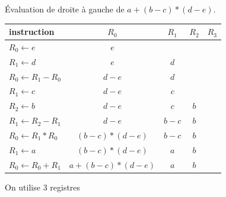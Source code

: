 \begin{Exercise}
 Évaluation de droite à gauche de $a+(b-c)*(d-e)$.
  \begin{center}
    \begin{tabular}{l|c|c|c|c}
       instruction&$R_0$&$R_1$&$R_2$&$R_3$ \\
       \hline
       $R_0 \leftarrow e$& $e$&&&\\
       $R_1 \leftarrow d$& $e$&$d$&&\\
       $R_0 \leftarrow R_1-R_0$& $d-e$&$d$&&\\
       $R_1 \leftarrow c$& $d-e$&$c$&&\\
       $R_2 \leftarrow b$& $d-e$&$c$&$b$&\\
       $R_1 \leftarrow R_2-R_1$& $d-e$&$b-c$&$b$&\\
       $R_0 \leftarrow R_1*R_0$& $(b-c)*(d-e)$&$b-c$&$b$&\\
       $R_1 \leftarrow a$& $(b-c)*(d-e)$&$a$&$b$&\\
       $R_0 \leftarrow R_0+R_1$& $a+(b-c)*(d-e)$&$a$&$b$&\\
    \end{tabular}
  \end{center}
On utilise 3 registres\end{Exercise}
